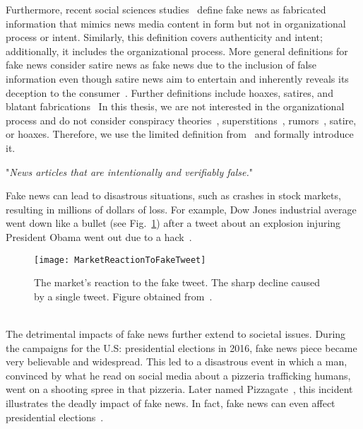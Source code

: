 Furthermore, recent social sciences studies~\parencite{TheScienceOfFakeNews_Lazer, ThePsycologyOfFakeNews_Pennycook} define fake news as fabricated information that mimics news media content in form but not in organizational process or intent. Similarly, this definition covers authenticity and intent; additionally, it includes the organizational process. More general definitions for fake news consider satire news as fake news due to the inclusion of false information even though satire news aim to entertain and inherently reveals its deception to the consumer~\parencite{WhenFakeNewsBecomesReal_Balmas, TheImpactOfRealNewsAboutFakeNews_Brewer, NewsVerificationByExploitingConflictingSocialViewpoints_Jin, FakeNewsOrTruthUsingSatiricalCues_Rubin}. Further definitions include hoaxes, satires, and blatant
fabrications~\parencite{DeceptionDetectionForFakeNews3TypesOfFakeNews_Rubin}
In this thesis, we are not interested in the organizational process and do not consider conspiracy theories~\parencite{ConspiracyTheories_Sunstein}, superstitions~\parencite{Superstition_Lindeman}, rumors~\parencite{RumorsAndHealthCareReform_Berinsky}, satire, or hoaxes. Therefore, we use the limited definition from~\parencite{SocialMediaAndFakeNewsIn2016Election_Allcott} and formally introduce it.
\begin{definition}
    "\emph{News articles that are intentionally and verifiably false.}"~\parencite{SocialMediaAndFakeNewsIn2016Election_Allcott}
\end{definition}
Fake news can lead to disastrous situations, such as crashes in stock markets, resulting in millions of dollars of loss. For example, Dow Jones industrial average went down like a bullet (see Fig.~\ref{fig:MarketReactionToFakeTweet}) after a tweet about an explosion injuring President Obama went out due to a hack~\parencite{MarketQuaversAfterFakeAPTweet_ElBoghdady}.
\begin{figure}
    \centering
    \texttt{[image: MarketReactionToFakeTweet]}
    \caption[Market Reaction to Fake Tweet.]{The market's reaction to the fake tweet. The sharp decline caused by a single tweet. Figure obtained from~\parencite{MarketQuaversAfterFakeAPTweet_ElBoghdady}.}\label{fig:MarketReactionToFakeTweet}
\end{figure}\\
The detrimental impacts of fake news further extend to societal issues. During the campaigns for the U.S: presidential elections in 2016, fake news piece became very believable and widespread. This led to a disastrous event in which a man, convinced by what he read on social media about a pizzeria trafficking humans, went on a shooting spree in that pizzeria. Later named Pizzagate~\parencite{Pizzagate_Fisher}, this incident illustrates the deadly impact of fake news. In fact, fake news can even affect presidential elections~\parencite{SocialMediaAndFakeNewsIn2016Election_Allcott, TrumpWonBecauseOfFacebook_Read}.\\
